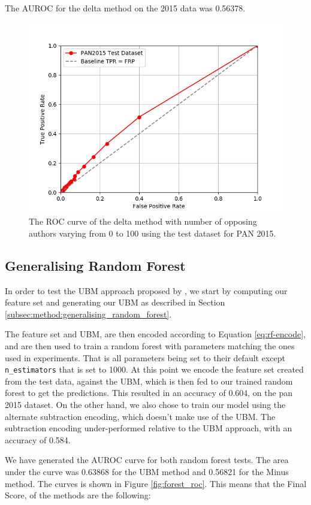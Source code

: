 The \gls{AUROC} for the delta method on the 2015 data was 0.56378.

\begin{figure}
    \centering
    \includegraphics[width=.7\textwidth]{./pictures/delta_method_roc.png}
    \caption{The ROC curve of the delta method with number of opposing authors
    varying from 0 to 100 using the test dataset for PAN 2015.}
    \label{fig:delta_method_roc}
\end{figure}

\subsection{Generalising Random Forest} \label{subsec:results:generalising_random_forest}
In order to test the \gls{UBM} approach proposed by \cite{pacheco2015}, we start
by computing our feature set and generating our \gls{UBM} as described in
Section \ref{subsec:method:generalising_random_forest}.

The feature set and \gls{UBM}, are then encoded according to Equation
\eqref{eq:rf-encode}, and are then used to train a random forest with parameters
matching the ones used in experiments. That is all parameters being set to their
default except \texttt{n\_estimators} that is set to 1000. At this point we
encode the feature set created from the test data, against the \gls{UBM}, which
is then fed to our trained random forest to get the predictions. This resulted
in an accuracy of 0.604, on the pan 2015 dataset. On the other hand, we also
chose to train our model using the alternate subtraction encoding, which doesn't
make use of the \gls{UBM}. The subtraction encoding under-performed relative to
the \gls{UBM} approach, with an accuracy of 0.584.

We have generated the \gls{AUROC} curve for both random forest tests. The area
under the curve was 0.63868 for the \gls{UBM} method and 0.56821 for the Minus
method. The curves is shown in Figure \ref{fig:forest_roc}. 
This means that the Final Score, of the methods are the following:


